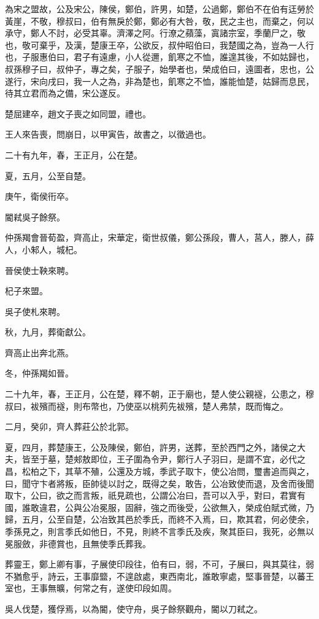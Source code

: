 \begin{pinyinscope}
為宋之盟故，公及宋公，陳侯，鄭伯，許男，如楚，公過鄭，鄭伯不在伯有迋勞於黃崖，不敬，穆叔曰，伯有無戾於鄭，鄭必有大咎，敬，民之主也，而棄之，何以承守，鄭人不討，必受其辜。濟澤之阿。行潦之蘋藻，寘諸宗室，季蘭尸之，敬也，敬可棄乎，及漢，楚康王卒，公欲反，叔仲昭伯曰，我楚國之為，豈為一人行也，子服惠伯曰，君子有遠慮，小人從邇，飢寒之不恤，誰遑其後，不如姑歸也，叔孫穆子曰，叔仲子，專之矣，子服子，始學者也，榮成伯曰，遠圖者，忠也，公遂行，宋向戌曰，我一人之為，非為楚也，飢寒之不恤，誰能恤楚，姑歸而息民，待其立君而為之備，宋公遂反。

楚屈建卒，趙文子喪之如同盟，禮也。

王人來告喪，問崩日，以甲寅告，故書之，以徵過也。

二十有九年，春，王正月，公在楚。

夏，五月，公至自楚。

庚午，衛侯衎卒。

閽弒吳子餘祭。

仲孫羯會晉荀盈，齊高止，宋華定，衛世叔儀，鄭公孫段，曹人，莒人，滕人，薛人，小邾人，城杞。

晉侯使士鞅來聘。

杞子來盟。

吳子使札來聘。

秋，九月，葬衛獻公。

齊高止出奔北燕。

冬，仲孫羯如晉。

二十九年，春，王正月，公在楚，釋不朝，正于廟也，楚人使公親襚，公患之，穆叔曰，袚殯而襚，則布幣也，乃使巫以桃茢先袚殯，楚人弗禁，既而悔之。

二月，癸卯，齊人葬莊公於北郭。

夏，四月，葬楚康王，公及陳侯，鄭伯，許男，送葬，至於西門之外，諸侯之大夫，皆至于墓，楚郟敖即位，王子圍為令尹，鄭行人子羽曰，是謂不宜，必代之昌，松柏之下，其草不殖，公還及方城，季武子取卞，使公冶問，璽書追而與之，曰，聞守卞者將叛，臣帥徒以討之，既得之矣，敢告，公冶致使而退，及舍而後聞取卞，公曰，欲之而言叛，祇見疏也，公謂公冶曰，吾可以入乎，對曰，君實有國，誰敢違君，公與公冶冕服，固辭，強之而後受，公欲無入，榮成伯賦式微，乃歸，五月，公至自楚，公冶致其邑於季氏，而終不入焉，曰，欺其君，何必使余，季孫見之，則言季氏如他日，不見，則終不言季氏及疾，聚其臣曰，我死，必無以冕服斂，非德賞也，且無使季氏葬我。

葬靈王，鄭上卿有事，子展使印段往，伯有曰，弱，不可，子展曰，與其莫往，弱不猶愈乎，詩云，王事靡盬，不遑啟處，東西南北，誰敢寧處，堅事晉楚，以蕃王室也，王事無曠，何常之有，遂使印段如周。

吳人伐楚，獲俘焉，以為閽，使守舟，吳子餘祭觀舟，閽以刀弒之。


\end{pinyinscope}

